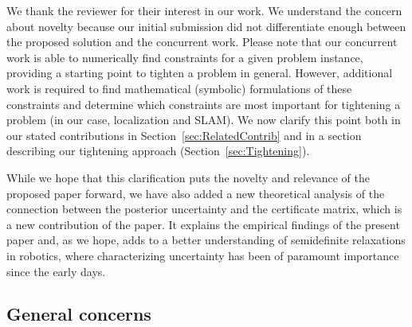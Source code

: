 \begin{response}
    We thank the reviewer for their interest in our work. We understand the concern about novelty because our initial submission did not differentiate enough between the proposed solution and the concurrent work. Please note that our concurrent work is able to numerically find constraints for a given problem instance, providing a starting point to tighten a problem in general. However, additional work is required to find mathematical (symbolic) formulations of these constraints and determine which constraints are most important for tightening a problem (in our case, localization and SLAM). We now clarify this point both in our stated contributions in Section~\ref{sec:RelatedContrib} and in a section describing our tightening approach (Section~\ref{sec:Tightening}).

    While we hope that this clarification puts the novelty and relevance of the proposed paper forward, we have also added a new theoretical analysis of the connection between the posterior uncertainty and the certificate matrix, which is a new contribution of the paper. It explains the empirical findings of the present paper and, as we hope, adds to a better understanding of semidefinite relaxations in robotics, where characterizing uncertainty has been of paramount importance since the early days. 
\end{response}

\subsection*{General concerns}


